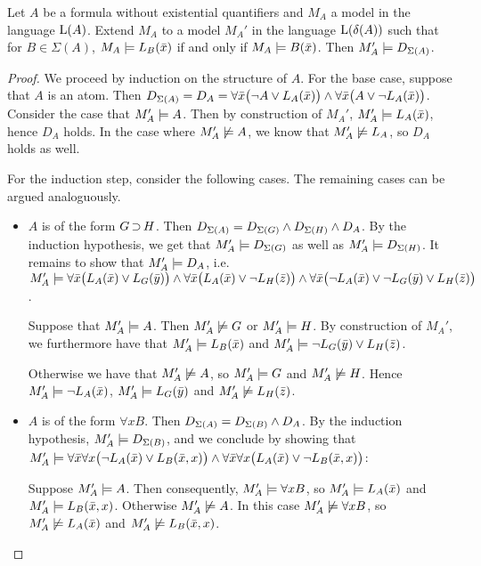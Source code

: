 \begin{lemma}
	\label{lemma:m_prime}
	Let $A$ be a formula without existential quantifiers and $M_A$ a model in the language $\operatorname{L}(A)$.
	Extend $M_A$ to a model $M_A'$ in the language $\operatorname{L}(\delta(A))$ such that for $B\in\Sigma(A)$, $M_A\models L_B(\bar x)$ if and only if $M_A \models B(\bar x)$.
	Then $M_A' \models D_{\Sigma(A)}$.
\end{lemma}
\begin{proof}
	We proceed by induction on the structure of $A$.
	For the base case, suppose that $A$ is an atom. 
	Then $D_{\Sigma(A)} = D_A  =\allowbreak \forall \bar x \big(\lnot A \lor L_A(\bar x)\big) \land\allowbreak \forall \bar x \big(A \lor \lnot L_A(\bar x)\big)$. 
	Consider the case that $M_A' \models A$. Then by construction of $M_A'$, $M_A'\models L_A(\bar x)$, hence $D_A$ holds.
	In the case where $M_A' \not\models A$, we know that $M_A' \not\models L_A$, so $D_A$ holds as well.

	For the induction step, consider the following cases. The remaining cases can be argued analoguously.
	\begin{itemize}
		\item $A$ is of the form $G \operatorname{\supset} H$. 
			Then $D_{\Sigma(A)} =
			D_{\Sigma(G)} \land
			D_{\Sigma(H)} \land D_A$.
			By the induction hypothesis, we get that $M_A' \models D_{\Sigma(G)}$ as well as $M_A' \models D_{\Sigma(H)}$.
			It remains to show that $M_A' \models D_A$, i.e.~
			$M_A' \models \forall \bar x \big(L_A(\bar x) \lor L_G(\bar y)\big) \land
		\forall \bar x \big(L_A(\bar x) \lor \lnot L_H(\bar z)\big) \land \forall \bar x \big(\lnot L_A(\bar x) \lor \lnot L_G(\bar y) \lor L_H(\bar z)\big)  $.

		Suppose that $M_A' \models A$.
		Then $M_A' \not\models G$ or $M_A' \models H$. By construction of $M_A'$, we furthermore have that $M_A' \models L_B(\bar x)$ and $M_A' \models \lnot L_G(\bar y) \lor L_H(\bar z)$.

		Otherwise we have that $M_A' \not\models A$, so $M_A' \models G$ and $M_A' \not\models H$.
		Hence $M_A' \models \lnot  L_A(\bar x)$, $M_A' \models L_G(\bar y)$ and $M_A' \not\models L_H(\bar z)$.

		\item $A$ is of the form $\forall x B$.
			Then $D_{\Sigma(A)} =
			D_{\Sigma(B)} \land D_A$.
			By the induction hypothesis,  $M_A' \models D_{\Sigma(B)}$, and we conclude by showing that $M_A' \models \forall \bar x \forall x \big(\lnot L_A(\bar x) \lor L_B(\bar x, x)\big) \land \forall \bar x \forall x \big(L_A(\bar x) \lor \lnot L_B(\bar x, x)\big)$:


			Suppose $M_A' \models A$. Then consequently, $M_A' \models \forall x B$, so $M_A' \models L_A(\bar x)$ and $M_A' \models L_B(\bar x, x)$.
			Otherwise $M_A' \not\models A$. In this case $M_A' \not\models \forall x B$, so $M_A' \not\models L_A(\bar x)$ and $M_A' \not\models L_B(\bar x, x)$.
			\qedhere
	\end{itemize}

\end{proof}
